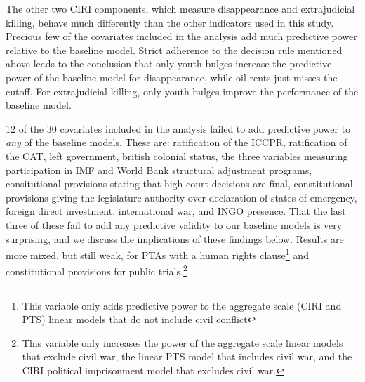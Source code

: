 \documentclass[12pt]{article}
\begin{document}
The other two CIRI components, which measure disappearance and extrajudicial killing, behave much differently than the other indicators used in this study. Precious few of the covariates included in the analysis add much predictive power relative to the baseline model. Strict adherence to the decision rule mentioned above leads to the conclusion that only youth bulges increase the predictive power of the baseline model for disappearance, while oil rents just misses the cutoff. For extrajudicial killing, only youth bulges improve the performance of the baseline model. 

12 of the 30 covariates included in the analysis failed to add predictive power to {\it any} of the baseline models. These are: ratification of the ICCPR, ratification of the CAT, left government, british colonial status, the three variables measuring participation in IMF and World Bank structural adjustment programs, consitutional provisions stating that high court decisions are final, constitutional provisions giving the legislature authority over declaration of states of emergency, foreign direct investment, international war, and INGO presence. That the last three of these fail to add any predictive validity to our baseline models is very surprising, and we discuss the implications of these findings below. Results are more mixed, but still weak, for PTAs with a human rights clause\footnote{This variable only adds predictive power to the aggregate scale (CIRI and PTS) linear models that do not include civil conflict} and constitutional provisions for public trials.\footnote{This variable only increases the power of the aggregate scale linear models that exclude civil war, the linear PTS model that includes civil war, and the CIRI political imprisonment model that excludes civil war.}
\end{document}
